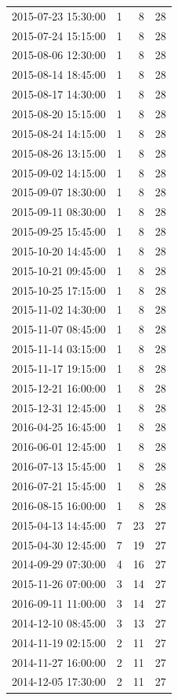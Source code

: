 \begin{tabular}{lrrr}
2015-07-23 15:30:00 & 1 & 8 & 28 \\
2015-07-24 15:15:00 & 1 & 8 & 28 \\
2015-08-06 12:30:00 & 1 & 8 & 28 \\
2015-08-14 18:45:00 & 1 & 8 & 28 \\
2015-08-17 14:30:00 & 1 & 8 & 28 \\
2015-08-20 15:15:00 & 1 & 8 & 28 \\
2015-08-24 14:15:00 & 1 & 8 & 28 \\
2015-08-26 13:15:00 & 1 & 8 & 28 \\
2015-09-02 14:15:00 & 1 & 8 & 28 \\
2015-09-07 18:30:00 & 1 & 8 & 28 \\
2015-09-11 08:30:00 & 1 & 8 & 28 \\
2015-09-25 15:45:00 & 1 & 8 & 28 \\
2015-10-20 14:45:00 & 1 & 8 & 28 \\
2015-10-21 09:45:00 & 1 & 8 & 28 \\
2015-10-25 17:15:00 & 1 & 8 & 28 \\
2015-11-02 14:30:00 & 1 & 8 & 28 \\
2015-11-07 08:45:00 & 1 & 8 & 28 \\
2015-11-14 03:15:00 & 1 & 8 & 28 \\
2015-11-17 19:15:00 & 1 & 8 & 28 \\
2015-12-21 16:00:00 & 1 & 8 & 28 \\
2015-12-31 12:45:00 & 1 & 8 & 28 \\
2016-04-25 16:45:00 & 1 & 8 & 28 \\
2016-06-01 12:45:00 & 1 & 8 & 28 \\
2016-07-13 15:45:00 & 1 & 8 & 28 \\
2016-07-21 15:45:00 & 1 & 8 & 28 \\
2016-08-15 16:00:00 & 1 & 8 & 28 \\
2015-04-13 14:45:00 & 7 & 23 & 27 \\
2015-04-30 12:45:00 & 7 & 19 & 27 \\
2014-09-29 07:30:00 & 4 & 16 & 27 \\
2015-11-26 07:00:00 & 3 & 14 & 27 \\
2016-09-11 11:00:00 & 3 & 14 & 27 \\
2014-12-10 08:45:00 & 3 & 13 & 27 \\
2014-11-19 02:15:00 & 2 & 11 & 27 \\
2014-11-27 16:00:00 & 2 & 11 & 27 \\
2014-12-05 17:30:00 & 2 & 11 & 27 \\

\end{tabular}
